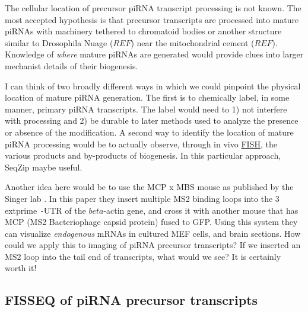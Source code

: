     The cellular location of precursor piRNA transcript processing is not known. The most accepted hypothesis is that precursor transcripts are processed into mature piRNAs with machinery tethered to chromatoid bodies \citep{Meikar2014} or another structure similar to Drosophila Nuage ($REF$) near the mitochondrial cement ($REF$). Knowledge of \textit{where} mature piRNAs are generated would provide clues into larger mechanist details of their biogenesis. 

    I can think of two broadly different ways in which we could pinpoint the physical location of mature piRNA generation. The first is to chemically label, in some manner, primary piRNA transcripts. The label would need to 1) not interfere with processing and 2) be durable to later methods used to analyze the presence or absence of the modification. A second way to identify the location of mature piRNA processing would be to actually observe, through in vivo \hyperref[hd:abrevs]{FISH}, the various products and by-products of biogenesis. In this particular approach, SeqZip maybe useful.

    Another idea here would be to use the MCP x MBS mouse as published by the Singer lab \citep{Park2014}. In this paper they insert multiple MS2 binding loops into the 3  extprime~-UTR of the $beta$-actin gene, and cross it with another mouse that has MCP (MS2 Bacteriophage capsid protein) fused to GFP. Using this system they can visualize \textit{endogenous} mRNAs in cultured MEF cells, and brain sections. How could we apply this to imaging of piRNA precursor transcripts? If we inserted an MS2 loop into the tail end of transcripts, what would we see? It is certainly worth it!

  \subsection{FISSEQ of piRNA precursor transcripts}



